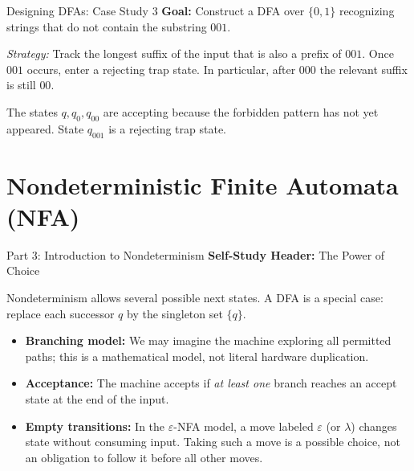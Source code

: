 \documentclass[10pt]{beamer}
\begin{document}
\begin{frame}{Designing DFAs: Case Study 3}
  \small
  \textbf{Goal:} Construct a DFA over $\{0,1\}$ recognizing strings that do
  not contain the substring $001$.
  \pause
  \vspace{0.2cm}
  
  \textit{Strategy:} Track the longest suffix of the input that is also a
  prefix of $001$. Once $001$ occurs, enter a rejecting trap state.
  In particular, after $000$ the relevant suffix is still $00$.
  
  \begin{center}
  \end{center}
  The states $q,q_0,q_{00}$ are accepting because the forbidden pattern has
  not yet appeared. State $q_{001}$ is a rejecting trap state.
\end{frame}

\section{Nondeterministic Finite Automata (NFA)}

\begin{frame}{Part 3: Introduction to Nondeterminism}
  \small
  \textbf{Self-Study Header:} The Power of Choice
  \vspace{0.2cm}
  
  Nondeterminism allows several possible next states. A DFA is a special
  case: replace each successor $q$ by the singleton set $\{q\}$.
  \pause
  \begin{itemize}
      \item \textbf{Branching model:} We may imagine the machine exploring all
        permitted paths; this is a mathematical model, not literal hardware
        duplication.
      \item \textbf{Acceptance:} The machine accepts if \textit{at least one} branch reaches an accept state at the end of the input.
      \item \textbf{Empty transitions:} In the $\varepsilon$-NFA model,
        a move labeled $\varepsilon$ (or $\lambda$) changes state without
        consuming input. Taking such a move is a possible choice, not an
        obligation to follow it before all other moves.
  \end{itemize}
\end{frame}
\end{document}
